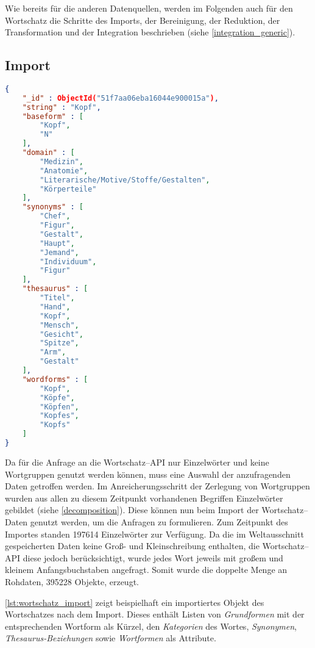 Wie bereits für die anderen Datenquellen, werden im Folgenden auch für den Wortschatz die Schritte des Imports, der Bereinigung, der Reduktion, der Transformation und der Integration beschrieben (siehe \cref{integration_generic}).

\subsection{Import}

\begin{lstlisting}[language=json, label={lst:wortschatz_import}, caption={JSON--Beispiel für Rohdaten aus dem Wortschatz}, float]
{
    "_id" : ObjectId("51f7aa06eba16044e900015a"),
    "string" : "Kopf",
    "baseform" : [ 
        "Kopf", 
        "N"
    ],
    "domain" : [ 
        "Medizin", 
        "Anatomie", 
        "Literarische/Motive/Stoffe/Gestalten", 
        "Körperteile"
    ],
    "synonyms" : [  
        "Chef", 
        "Figur", 
        "Gestalt", 
        "Haupt", 
        "Jemand", 
        "Individuum", 
        "Figur"
    ],
    "thesaurus" : [ 
        "Titel", 
        "Hand", 
        "Kopf", 
        "Mensch", 
        "Gesicht", 
        "Spitze", 
        "Arm", 
        "Gestalt"
    ],
    "wordforms" : [ 
        "Kopf", 
        "Köpfe", 
        "Köpfen", 
        "Kopfes", 
        "Kopfs"
    ]
}
\end{lstlisting}

Da für die Anfrage an die Wortschatz--API nur Einzelwörter und keine Wortgruppen genutzt werden können, muss eine Auswahl der anzufragenden Daten getroffen werden. Im Anreicherungsschritt der Zerlegung von Wortgruppen wurden aus allen zu diesem Zeitpunkt vorhandenen Begriffen Einzelwörter gebildet (siehe \cref{decomposition}). Diese können nun beim Import der Wortschatz--Daten genutzt werden, um die Anfragen zu formulieren. Zum Zeitpunkt des Importes standen \num{197614} Einzelwörter zur Verfügung. Da die im Weltausschnitt gespeicherten Daten keine Groß- und Kleinschreibung enthalten, die Wortschatz--API diese jedoch berücksichtigt, wurde jedes Wort jeweils mit großem und kleinem Anfangsbuchstaben angefragt. Somit wurde die doppelte Menge an Rohdaten, \num{395228} Objekte, erzeugt.

\cref{lst:wortschatz_import} zeigt beispielhaft ein importiertes Objekt des Wortschatzes nach dem Import. Dieses enthält Listen von \emph{Grundformen} mit der entsprechenden Wortform als Kürzel, den \emph{Kategorien} des Wortes, \emph{Synonymen}, \emph{Thesaurus-Beziehungen} sowie \emph{Wortformen} als Attribute.

